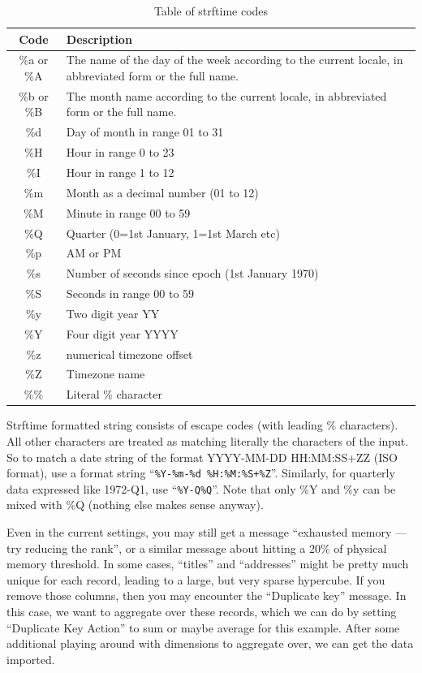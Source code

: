 \begin{table}
  \begin{tabular}{|c|l|}
    \hline Code & Description \\\hline
    \%a or \%A &  The name of the day of the week according to the current locale,
                 in abbreviated form or the full name.\\
    \%b or \%B &  The month name according to the current locale,  in  abbreviated
                 form or the full name.\\
    \%d & Day of month in range 01 to 31\\
    \%H & Hour in range 0 to 23\\
    \%I & Hour in range 1 to 12\\
    \%m & Month as a decimal number (01 to 12)\\
    \%M & Minute in range 00 to 59\\
    \%Q & Quarter (0=1st January, 1=1st March etc)\\
    \%p & AM or PM\\
    \%s & Number of seconds since epoch (1st January 1970)\\
    \%S & Seconds in range 00 to 59 \\
    \%y & Two digit year YY\\
    \%Y & Four digit year YYYY\\
    \%z & numerical timezone offset\\
    \%Z & Timezone name\\
    \%\% & Literal \% character\\
    \hline
  \end{tabular}
  \caption{Table of strftime codes}
  \label{Strftime code}
\end{table}

Strftime formatted string consists of escape codes (with leading \%
characters). All other characters are treated as matching literally
the characters of the input. So to match a date string of the format
YYYY-MM-DD HH:MM:SS+ZZ (ISO format), use a format string
``\verb|%Y-%m-%d %H:%M:%S+%Z|''. Similarly, for quarterly data
expressed like 1972-Q1, use ``\verb+%Y-Q%Q+''. Note that only \%Y and
\%y can be mixed with \%Q (nothing else makes sense anyway).

Even in the current settings, you may still get a message ``exhausted
memory --- try reducing the rank'', or a similar message about hitting
a 20\% of physical memory threshold. In some cases, ``titles'' and
``addresses'' might be pretty much unique for each record, leading to
a large, but very sparse hypercube. If you remove those columns, then
you may encounter the ``Duplicate key'' message. In this case, we want
to aggregate over these records, which we can do by setting
``Duplicate Key Action'' to sum or maybe average for this
example. After some additional playing around with dimensions to
aggregate over, we can get the data imported.

